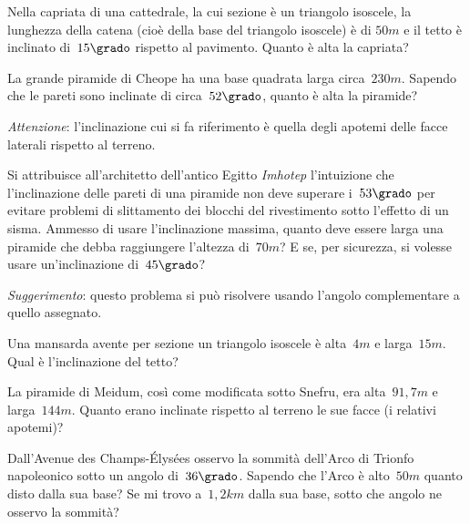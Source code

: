 \begin{multicols}{2}
\begin{esercizio}[\Ast]
\label{ese:G.57}
Nella capriata di una cattedrale, la cui sezione è un triangolo isoscele, la lunghezza della catena (cioè della base del triangolo isoscele) è di
$50\unit{m}$ e il tetto è inclinato di~$15\grado$ rispetto al pavimento. Quanto è alta la capriata?
\end{esercizio}

\begin{esercizio}[\Ast]
\label{ese:G.58}
La grande piramide di Cheope ha una base quadrata larga circa~$230\unit{m}$. Sapendo che le pareti sono inclinate di circa~$52\grado$,
quanto è alta la piramide?

\emph{Attenzione}: l'inclinazione cui si fa riferimento è quella degli apotemi delle facce laterali rispetto al terreno.
\end{esercizio}

\begin{esercizio}[\Ast]
\label{ese:G.59}
Si attribuisce all'architetto dell'antico Egitto \emph{Imhotep} l'intuizione che l'inclinazione delle pareti di una piramide non deve superare
i~$53\grado$ per evitare problemi di slittamento dei blocchi del rivestimento sotto l'effetto di un sisma. Ammesso di usare
l'inclinazione massima, quanto deve essere larga una piramide che debba raggiungere l'altezza di~$70\unit{m}$?
E se, per sicurezza, si volesse usare un'inclinazione di~$45\grado$?

\emph{Suggerimento}: questo problema si può risolvere usando l'angolo complementare a quello assegnato.
\end{esercizio}

\begin{esercizio}[\Ast]
\label{ese:G.60}
Una mansarda avente per sezione un triangolo isoscele è alta~$4\unit{m}$ e larga~$15\unit{m}$. Qual è l'inclinazione del tetto?
\end{esercizio}

\begin{esercizio}[\Ast]
\label{ese:G.61}
La piramide di Meidum, così come modificata sotto Snefru, era alta~$91,7\unit{m}$ e larga~$144\unit{m}$.
Quanto erano inclinate rispetto al terreno le sue facce (i relativi apotemi)?
\end{esercizio}

\begin{esercizio}[\Ast]
\label{ese:G.62}
Dall'Avenue des Champs-Élysées osservo la sommità dell'Arco di Trionfo napoleonico sotto un angolo di~$36\grado$.
Sapendo che l'Arco è alto~$50\unit{m}$ quanto disto dalla sua base? Se mi trovo a~$1,2\unit{km}$ dalla sua base,
sotto che angolo ne osservo la sommità?
\end{esercizio}


\end{multicols}
